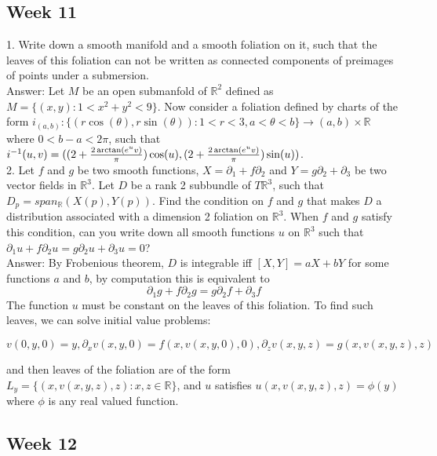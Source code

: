 \documentclass{article}
\theoremstyle{definition}
\begin{document}
\newpage

\subsection{Week 11}

1. Write down a smooth manifold and a smooth foliation on it, such that the leaves of this foliation can not be written as connected components of preimages of points under a submersion.\\

Answer: Let $M$ be an open submanfold of $\mathbb{R}^2$ defined as $M=\{(x, y): 1<x^2+y^2<9\}$. Now consider a foliation defined by charts of the form $i_{(a, b)}: \{(r\cos(\theta), r\sin(\theta)): 1<r<3, a<\theta<b\}\rightarrow (a, b)\times \mathbb{R}$ where $0<b-a<2\pi$, such that $i^{-1}(u, v)=((2+{2\arctan(e^uv)\over\pi})\cos(u), (2+{2\arctan(e^uv)\over\pi})\sin(u))$.\\

2. Let $f$ and $g$ be two smooth functions, $X=\partial_1+f\partial_2$ and $Y=g\partial_2+\partial_3$ be two vector fields in $\mathbb{R}^3$. Let $D$ be a rank 2 subbundle of $T\mathbb{R}^3$, such that $D_p=span_{\mathbb{R}}(X(p), Y(p))$. Find the condition on $f$ and $g$ that makes $D$ a distribution associated with a dimension 2 foliation on $\mathbb{R}^3$. When $f$ and $g$ satisfy this condition, can you write down all smooth functions $u$ on $\mathbb{R}^3$ such that $\partial_1 u+f\partial_2 u=g\partial_2 u+\partial_3u=0$?\\

Answer: By Frobenious theorem, $D$ is integrable iff $[X, Y]=aX+bY$ for some functions $a$ and $b$, by computation this is equivalent to \[\partial_1g+f\partial_2g=g\partial_2f+\partial_3 f\]
The function $u$ must be constant on the leaves of this foliation. To find such leaves, we can solve initial value problems:

\[v(0, y, 0)=y, \partial_x v(x, y, 0)=f(x, v(x, y, 0), 0), \partial_z v(x, y, z)=g(x, v(x, y, z), z)\]

and then leaves of the foliation are of the form $L_y=\{(x, v(x, y, z), z): x, z\in\mathbb{R}\}$, and $u$ satisfies
$u(x, v(x, y, z), z)=\phi(y)$ where $\phi$ is any real valued function.

\newpage

\subsection{Week 12}
\end{document}
